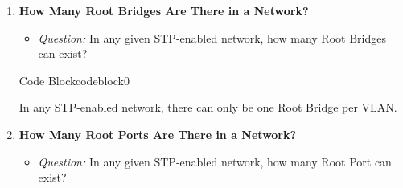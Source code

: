 \documentclass[a4paper]{book}
\begin{document}
\begin{enumerate}
\begin{ocg}{Code Block}{codeblock}{0}
\begin{tcolorbox}
{\begin{itemize}
					      \item \textbf{SW5:}
					            \begin{itemize}
						            \item \textit{F0/1 $\rightarrow$ SW3 (cost = 19) + G0/1 $\rightarrow$ SW2 (cost = 4) + G0/1 $\rightarrow$ SW1 (cost = 4) = 27}
					            \end{itemize}

					      \item \textbf{SW6:}
					            \begin{itemize}
						            \item \textit{F0/1 $\rightarrow$ SW4 (cost = 19) + G0/1 $\rightarrow$ SW1 (cost = 4) = 23}
					            \end{itemize}
				      \end{itemize}
			      }
		      \end{tcolorbox}
	      \end{ocg}


	\item \textbf{How Many Root Bridges Are There in a Network?}
	      \begin{itemize}
		      \item \textit{Question:} In any given STP-enabled network, how many Root Bridges can exist?
	      \end{itemize}


	      \begin{ocg}{Code Block}{codeblock}{0}
		      \vspace{0.5cm}
		      \begin{tcolorbox}
			      \small{
				      In any STP-enabled network, there can only be one Root Bridge per VLAN.
			      }
		      \end{tcolorbox}
	      \end{ocg}



	\item \textbf{How Many Root Ports Are There in a Network?}
	      \begin{itemize}
		      \item \textit{Question:} In any given STP-enabled network, how many Root Port can exist?
	      \end{itemize}


\end{enumerate}
\end{document}

